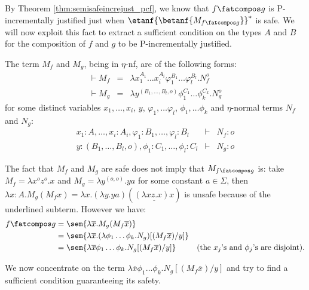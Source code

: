 By Theorem \ref{thm:semisafeincrejust_pcf}, we know that $f\fatcompos g$ is P-incrementally justified just when $\etanf{\betanf{M_{f\fatcompos g}}}^*$ is safe. 
We will now exploit this fact to extract a sufficient condition on the types $A$ and $B$ for 
the composition of $f$ and $g$ to be P-incrementally justified.

The term $M_f$ and $M_g$, being in $\eta$-nf, are of the following forms:
\begin{eqnarray*}
\vdash M_f &=& \lambda x_1^{A_1} \ldots x_i^{A_i} \varphi_1^{B_1} \ldots \varphi_l^{B_l} . N_f^o\\
\vdash  M_g &=& \lambda y^{ (B_1, \ldots, B_l,o)} \phi_1^{C_1} \ldots \phi_k^{C_k} . N_g^o
\end{eqnarray*}
for some distinct variables $x_1, \ldots, x_i$, $y$, $\varphi_1, \dots \varphi_l$, $\phi_1, \dots \phi_k$  and $\eta$-normal terms $N_f$ and $N_g$:
\begin{eqnarray*}
x_1:A, \ldots, x_i:A_i, \varphi_1:B_1, \dots, \varphi_l:B_l &\vdash& N_f :o \\
y: (B_1, \ldots, B_l,o), \phi_1:C_1, \dots, \phi_l:C_l &\vdash& N_g :o
\end{eqnarray*}


 
The fact that $M_f$ and $M_g$ are safe does not imply that $M_{f\fatcompos g}$ is: take $M_f = \lambda x^o z^o.x$ and $M_g = \lambda y^{(o,o)} . y a$ for some constant $a\in \Sigma$, then $\lambda x:A . M_g (M_f x) = \lambda x . (\lambda y . y a) ( \underline{(\lambda x z.x) x} )$ is unsafe because of the underlined subterm. However we have:
\begin{align*}
f\fatcompos g &= \sem{\lambda \overline{x} . M_g (M_f  \overline{x})} \\
 &= \sem{\lambda \overline{x} . (\lambda \phi_1\ldots \phi_k . N_g) [(M_f \overline{x}) / y]} \\
&= \sem{\lambda \overline{x} \phi_1 \dots \phi_k. N_g [(M_f  \overline{x}) / y]}
& \mbox{(the $x_j$'s and $\phi_j$'s are disjoint)}.
\end{align*}

We now concentrate on the term  $\lambda \overline{x} \phi_1 \dots \phi_k. N_g [(M_f  \overline{x}) / y]$ and try to find a sufficient condition guaranteeing its safety.
